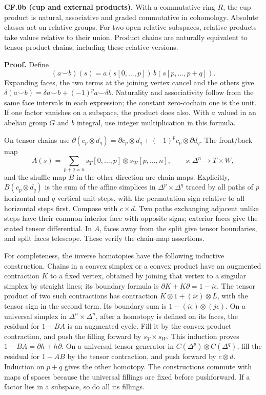 \documentclass[
  11pt,
]{article}
\begin{document}
\textbf{CF.0b (cup and external products).} With a commutative ring
\(R\), the cup product is natural, associative and graded commutative in
cohomology. Absolute classes act on relative groups. For two open
relative subspaces, relative products take values relative to their
union. Product chains are naturally equivalent to tensor-product chains,
including these relative versions.

\textbf{Proof.} Define \[
(a\smile b)(s)=a(s[0,\ldots,p])\,b(s[p,\ldots,p+q]).
\] Expanding faces, the two terms at the joining vertex cancel and the
others give
\(\delta(a\smile b)=\delta a\smile b+(-1)^p a\smile\delta b\).
Naturality and associativity follow from the same face intervals in each
expression; the constant zero-cochain one is the unit. If one factor
vanishes on a subspace, the product does also. With \(a\) valued in an
abelian group \(G\) and \(b\) integral, use integer multiplication in
this formula.

On tensor chains use
\(\partial(c_p\otimes d_q)=\partial c_p\otimes d_q+(-1)^p c_p\otimes\partial d_q\).
The front/back map \[
A(s)=\sum_{p+q=n}s_T[0,\ldots,p]\otimes s_W[p,\ldots,n],
\qquad s:\Delta^n\to T\times W,
\] and the shuffle map \(B\) in the other direction are chain maps.
Explicitly, \(B(c_p\otimes d_q)\) is the sum of the affine simplices in
\(\Delta^p\times\Delta^q\) traced by all paths of \(p\) horizontal and
\(q\) vertical unit steps, with the permutation sign relative to all
horizontal steps first. Compose with \(c\times d\). Two paths exchanging
adjacent unlike steps have their common interior face with opposite
signs; exterior faces give the stated tensor differential. In \(A\),
faces away from the split give tensor boundaries, and split faces
telescope. These verify the chain-map assertions.

For completeness, the inverse homotopies have the following inductive
construction. Chains in a convex simplex or a convex product have an
augmented contraction \(K\) to a fixed vertex, obtained by joining that
vertex to a singular simplex by straight lines; its boundary formula is
\(\partial K+K\partial=1-i\epsilon\). The tensor product of two such
contractions has contraction \(K\otimes1+(i\epsilon)\otimes L\), with
the tensor sign in the second term. Its boundary sum is
\(1-(i\epsilon)\otimes(j\epsilon)\). On a universal simplex in
\(\Delta^n\times\Delta^n\), after a homotopy is defined on its faces,
the residual for \(1-BA\) is an augmented cycle. Fill it by the
convex-product contraction, and push the filling forward by
\(s_T\times s_W\). This induction proves \(1-BA=\partial h+h\partial\).
On a universal tensor generator in \(C(\Delta^p)\otimes C(\Delta^q)\),
fill the residual for \(1-AB\) by the tensor contraction, and push
forward by \(c\otimes d\). Induction on \(p+q\) gives the other
homotopy. The constructions commute with maps of spaces because the
universal fillings are fixed before pushforward. If a factor lies in a
subspace, so do all its fillings.
\end{document}
